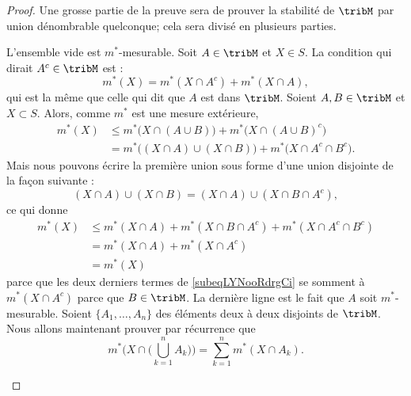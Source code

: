 \begin{proof}
	Une grosse partie de la preuve sera de prouver la stabilité de \( \tribM\) par union dénombrable quelconque; cela sera divisé en plusieurs parties.
	\begin{subproof}
		L'ensemble vide est \( m^*\)-mesurable.
		Soit \( A\in\tribM\) et \( X\in S\). La condition qui dirait \( A^c\in\tribM\) est :
		\begin{equation}
			m^*(X)=m^*(X\cap A^c)+m^*(X\cap A),
		\end{equation}
		qui est la même que celle qui dit que \( A\) est dans \( \tribM\).
		Soient \( A,B\in\tribM\) et \( X\subset S\). Alors, comme \( m^*\) est une mesure extérieure,
		\begin{subequations}
			\begin{align}
				m^*(X) & \leq m^*\big(  X\cap(A\cup B) \big)+m^*\big( X\cap (A\cup B)^c \big)         \\
				       & =    m^*\big( (X\cap A)\cup(X\cap B) \big)+m^*\big( X\cap A^c\cap B^c \big).
			\end{align}
		\end{subequations}
		Mais nous pouvons écrire la première union sous forme d'une union disjointe de la façon suivante :
		\begin{equation}
			(X\cap A)\cup(X\cap B)=(X\cap A)\cup(X\cap B\cap A^c),
		\end{equation}
		ce qui donne
		\begin{subequations}
			\begin{align}
				m^*(X) & \leq m^*(X\cap A)+m^*(X\cap B\cap A^c)+m^*(X\cap A^c\cap B^c)   \label{subeqLYNooRdrgCi} \\
				       & =    m^*(X\cap A)+m^*(X\cap A^c)                                                         \\
				       & =    m^*(X)
			\end{align}
		\end{subequations}
		parce que les deux derniers termes de \eqref{subeqLYNooRdrgCi} se somment à \( m^*(X\cap A^c)\) parce que \( B\in \tribM\). La dernière ligne est le fait que \( A\) soit \( m^*\)-mesurable.
		Soient \( \{ A_1,\ldots, A_n \}\) des éléments deux à deux disjoints de \( \tribM\). Nous allons maintenant prouver par récurrence que
		\begin{equation}    \label{EqBRIooAnPCd}
			m^*\Big( X\cap\big( \bigcup_{k=1}^nA_k \big) \Big)=\sum_{k=1}^nm^*(X\cap A_k).

\end{equation}
\end{subproof}
\end{proof}
